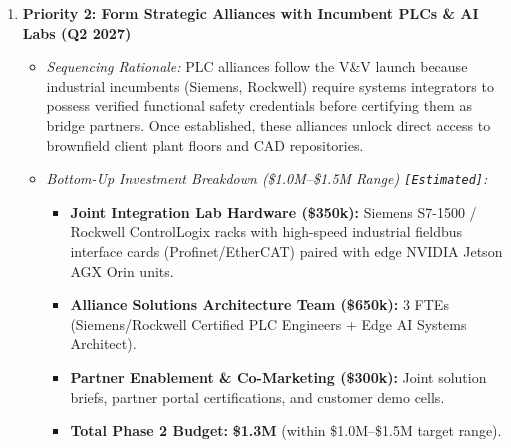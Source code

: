 \documentclass[11pt,a4paper]{article}
\begin{document}
\begin{enumerate}
    \item \textbf{Priority 2: Form Strategic Alliances with Incumbent PLCs \& AI Labs (Q2 2027)}
    \begin{itemize}
        \item \textit{Sequencing Rationale:} PLC alliances follow the V\&V launch because industrial incumbents (Siemens, Rockwell) require systems integrators to possess verified functional safety credentials before certifying them as bridge partners. Once established, these alliances unlock direct access to brownfield client plant floors and CAD repositories.
        \item \textit{Bottom-Up Investment Breakdown (\$1.0M--\$1.5M Range) \texttt{[Estimated]}:}
        \begin{itemize}
            \item \textbf{Joint Integration Lab Hardware (\$350k):} Siemens S7-1500 / Rockwell ControlLogix racks with high-speed industrial fieldbus interface cards (Profinet/EtherCAT) paired with edge NVIDIA Jetson AGX Orin units.
            \item \textbf{Alliance Solutions Architecture Team (\$650k):} 3 FTEs (Siemens/Rockwell Certified PLC Engineers + Edge AI Systems Architect).
            \item \textbf{Partner Enablement \& Co-Marketing (\$300k):} Joint solution briefs, partner portal certifications, and customer demo cells.
            \item \textbf{Total Phase 2 Budget:} \textbf{\$1.3M} (within \$1.0M--\$1.5M target range).
        \end{itemize}
    \end{itemize}


\end{enumerate}
\end{document}
